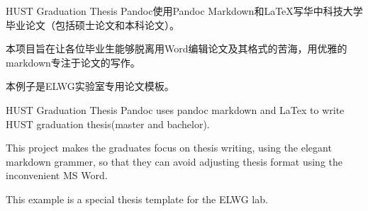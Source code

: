 \zhabstract
{
HUST Graduation Thesis Pandoc使用Pandoc Markdown和LaTeX写华中科技大学毕业论文（包括硕士论文和本科论文）。

本项目旨在让各位毕业生能够脱离用Word编辑论文及其格式的苦海，用优雅的markdown专注于论文的写作。

本例子是ELWG实验室专用论文模板。
}

\enabstract
{
HUST Graduation Thesis Pandoc uses pandoc markdown and LaTex to write HUST graduation thesis(master and bachelor).

This project makes the graduates focus on thesis writing, using the elegant markdown grammer, so that they can avoid adjusting thesis format using the inconvenient MS Word.

This example is a special thesis template for the ELWG lab.
}
